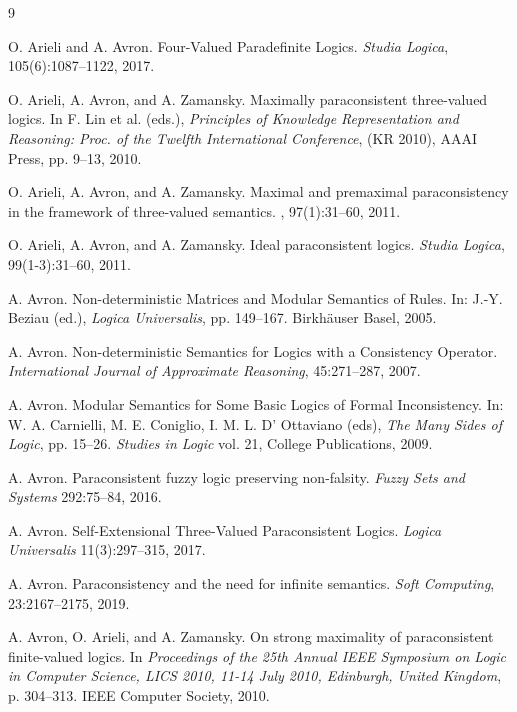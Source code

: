 \documentclass{article}
\theoremstyle{definition}
\begin{document}
 \begin{thebibliography}{9}


O. Arieli and A. Avron. Four-Valued Paradefinite Logics. {\em Studia
Logica}, 105(6):1087--1122,  2017.


O. Arieli, A. Avron, and A. Zamansky.
\newblock Maximally paraconsistent three-valued logics.
\newblock In F. Lin et al. (eds.),
  {\em Principles of Knowledge Representation and Reasoning: Proc. of the  Twelfth International Conference}, (KR 2010), {AAAI} Press,
  pp. 9--13, 2010.

O. Arieli, A. Avron, and A. Zamansky.
\newblock Maximal and premaximal paraconsistency in the framework of
  three-valued semantics.
, 97(1):31--60, 2011.


O. Arieli, A. Avron, and A. Zamansky. Ideal paraconsistent logics.
 {\em Studia Logica}, 99(1-3):31--60, 2011.

A. Avron. Non-deterministic Matrices and Modular Semantics of Rules. In: J.-Y. Beziau (ed.), {\em Logica Universalis}, pp. 149--167. Birkh\"auser Basel,  2005.


A. Avron. Non-deterministic Semantics for Logics with a Consistency Operator. {\em International Journal of Approximate Reasoning}, 45:271--287, 2007.


A. Avron. Modular Semantics for Some Basic Logics of Formal Inconsistency. In: W. A. Carnielli, M. E. Coniglio, I. M. L. D' Ottaviano (eds), {\em The Many Sides of Logic}, pp. 15--26. {\em Studies in Logic} vol.  21, College Publications, 2009.

 A. Avron.
Paraconsistent fuzzy logic preserving non-falsity. {\em 
Fuzzy Sets and Systems} 292:75--84, 2016.


 A. Avron.
Self-Extensional Three-Valued Paraconsistent Logics. {\em Logica Universalis} 11(3):297--315, 2017.

A. Avron.
Paraconsistency and the need for infinite semantics.
{\em Soft Computing}, 23:2167--2175, 2019.


A. Avron, O. Arieli, and A. Zamansky.
\newblock On strong maximality of paraconsistent finite-valued logics.
\newblock In {\em Proceedings of the 25th Annual {IEEE} Symposium on Logic in
  Computer Science, {LICS} 2010, 11-14 July 2010, Edinburgh, United Kingdom},
  p. 304--313. {IEEE} Computer Society, 2010.



\end{thebibliography}
\end{document}
